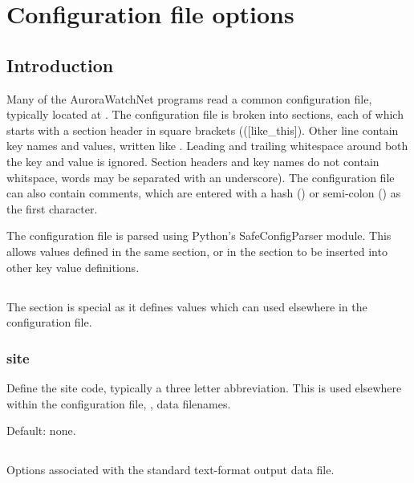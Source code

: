 \chapter{Configuration file options}

\newcommand{\configexample}[1]{\examplebox{#1}}

\section{Introduction}
Many of the AuroraWatchNet programs read a common configuration file,
typically located at . The configuration file
is broken into sections, each of which starts with a section header in
square brackets (\code({[like_this]}). Other line contain key names
and values, written like . Leading and trailing
whitespace around both the key and value is ignored. Section headers
and key names do not contain whitspace, words may be separated with an
underscore). The configuration file can also contain comments, which
are entered with a hash (\code{\#}) or semi-colon (\code{;}) as the
first character.

The configuration file is parsed using Python's SafeConfigParser
module. This allows values defined in the same section, or in the
\code{[DEFAULT]} section to be inserted into other key value
definitions.

\section{\code{[DEFAULT]}}

The \code{[DEFAULT]} section is special as it defines values which can
used elsewhere in the configuration file.

\subsection{site}
Define the site code, typically a three letter abbreviation. This is
used elsewhere within the configuration file, \eg, data filenames.

Default: none.

\configexample{\code{site = lan1}}

\section{\code{[awnettextdata]}}

Options associated with the standard text-format output data file.

